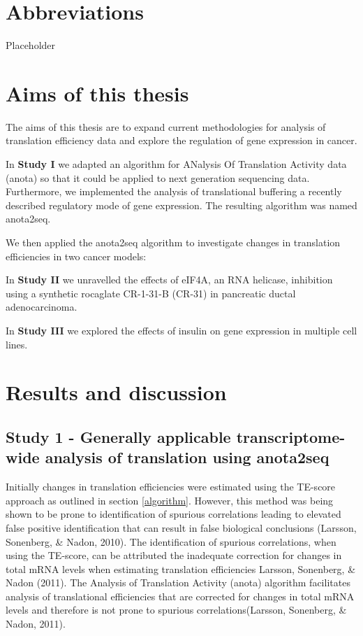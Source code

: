 \documentclass[
  12pt,
  openany]{book}
\author{}
\date{\vspace{-2.5em}}
\begin{document}
{
\setcounter{tocdepth}{4}
\tableofcontents
}
\hypertarget{abbreviations}{%
\chapter*{Abbreviations}\label{abbreviations}}

Placeholder

\chapter{Aims of this thesis}

The aims of this thesis are to expand current methodologies for analysis of translation efficiency data and explore the regulation of gene expression in cancer.

In \textbf{Study I} we adapted an algorithm for ANalysis Of Translation Activity data (anota) so that it could be applied to next generation sequencing data. Furthermore, we implemented the analysis of translational buffering a recently described regulatory mode of gene expression. The resulting algorithm was named anota2seq.

We then applied the anota2seq algorithm to investigate changes in translation efficiencies in two cancer models:

In \textbf{Study II} we unravelled the effects of eIF4A, an RNA helicase, inhibition using a synthetic rocaglate CR-1-31-B (CR-31) in pancreatic ductal adenocarcinoma.

In \textbf{Study III} we explored the effects of insulin on gene expression in multiple cell lines.

\chapter{Results and discussion}

\section{Study 1 - Generally applicable transcriptome-wide analysis of translation using anota2seq}

Initially changes in translation efficiencies were estimated using the TE-score approach as outlined in section \ref{algorithm}. However, this method was being shown to be prone to identification of spurious correlations leading to elevated false positive identification that can result in false biological conclusions (Larsson, Sonenberg, \& Nadon, 2010). The identification of spurious correlations, when using the TE-score, can be attributed the inadequate correction for changes in total mRNA levels when estimating translation efficiencies Larsson, Sonenberg, \& Nadon (2011). The Analysis of Translation Activity (anota) algorithm facilitates analysis of translational efficiencies that are corrected for changes in total mRNA levels and therefore is not prone to spurious correlations(Larsson, Sonenberg, \& Nadon, 2011).
\end{document}
